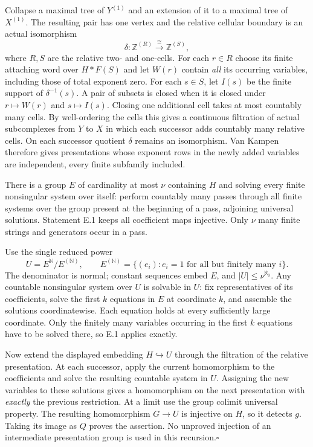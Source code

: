 Collapse a maximal tree of $Y^{(1)}$ and an extension of it to a
maximal tree of $X^{(1)}$. The resulting pair has one vertex and
the relative cellular boundary is an actual isomorphism
\[
 \delta:\mathbb Z^{(R)}\xrightarrow{\cong}\mathbb Z^{(S)},
\]
where $R,S$ are the relative two- and one-cells. For each $r\in R$
choose its finite attaching word over $H*F(S)$ and let $W(r)$ contain
\emph{all} its occurring variables, including those of total exponent
zero. For each $s\in S$, let $I(s)$ be the finite support of
$\delta^{-1}(s)$. A pair of subsets is closed when it is closed under
$r\mapsto W(r)$ and $s\mapsto I(s)$. Closing one additional cell
takes at most countably many cells. By well-ordering the cells this
gives a continuous filtration of actual subcomplexes from $Y$ to $X$
in which each successor adds countably many relative cells. On each
successor quotient $\delta$ remains an isomorphism. Van Kampen
therefore gives presentations whose exponent rows in the newly
added variables are independent, every finite subfamily included.

There is a group $E$ of cardinality at most $\nu$ containing $H$
and solving every finite nonsingular system over itself: perform
countably many passes through all finite systems over the group
present at the beginning of a pass, adjoining universal solutions.
Statement E.1 keeps all coefficient maps injective. Only $\nu$
many finite strings and generators occur in a pass.

Use the single reduced power
\[
 U=E^{\mathbb N}/E^{(\mathbb N)},\qquad
 E^{(\mathbb N)}=\{(e_i):e_i=1\text{ for all but finitely many }i\}.
\]
The denominator is normal; constant sequences embed $E$, and
$|U|\leq\nu^{\aleph_0}$. Any countable nonsingular system over $U$
is solvable in $U$: fix representatives of its coefficients, solve
the first $k$ equations in $E$ at coordinate $k$, and assemble the
solutions coordinatewise. Each equation holds at every sufficiently
large coordinate. Only the finitely many variables occurring in the
first $k$ equations have to be solved there, so E.1 applies exactly.

Now extend the displayed embedding $H\hookrightarrow U$ through
the filtration of the relative presentation. At each successor,
apply the current homomorphism to the coefficients and solve the
resulting countable system in $U$. Assigning the new variables to
these solutions gives a homomorphism on the next presentation with
\emph{exactly} the previous restriction. At a limit use the group
colimit universal property. The resulting homomorphism $G\to U$
is injective on $H$, so it detects $g$. Taking its image as $Q$
proves the assertion. No unproved injection of an intermediate
presentation group is used in this recursion.\hfill$\square$

